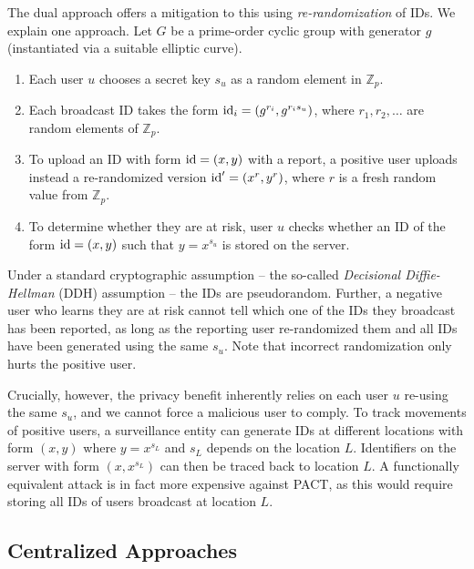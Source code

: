 \documentclass{article}
\begin{document}
The dual approach offers a mitigation to this using {\em re-randomization} of IDs. We explain one approach. Let $G$ be a prime-order cyclic group with generator $g$ (instantiated via a suitable elliptic curve). 
\begin{enumerate}
    \item Each user $u$ chooses a secret key $s_u$ as a random element in $\mathbb{Z}_p$.
    \item Each broadcast ID takes the form $\mathrm{id}_i = (g^{r_i}, g^{r_i s_u})$, where $r_1, r_2, \ldots$ are random elements of $\mathbb{Z}_p$.
    \item To upload an ID with form $\mathrm{id} = (x, y)$ with a report, a positive user uploads instead a re-randomized version $\mathrm{id}' = (x^r, y^r)$, where $r$ is a fresh random value from $\mathbb{Z}_p$.
    \item To determine whether they are at risk, user $u$ checks whether an ID of the form $\mathrm{id} = (x,y)$ such that $y = x^{s_u}$ is stored on the server.
\end{enumerate}
Under a standard cryptographic assumption -- the so-called {\em Decisional Diffie-Hellman} (DDH) assumption -- the IDs are pseudorandom. Further, a negative user who learns they are at risk cannot tell which one of the IDs they broadcast has been reported, as long as the reporting user re-randomized them and all IDs have been generated using the same $s_u$. Note that incorrect randomization only hurts the positive user.

Crucially, however, the privacy benefit inherently relies on each user $u$ re-using the same $s_u$, and we cannot force a malicious user to comply. To track movements of positive users, a surveillance entity can generate IDs at different locations with form $(x,y)$ where $y = x^{s_L}$ and $s_L$ depends on the location $L$. Identifiers on the server with form $(x, x^{s_L})$ can then be traced back to location $L$. A functionally equivalent attack is in fact more expensive against PACT, as this would require storing all IDs of users broadcast at location $L$.  


\subsection{Centralized Approaches}\label{sect:centr}
\end{document}
